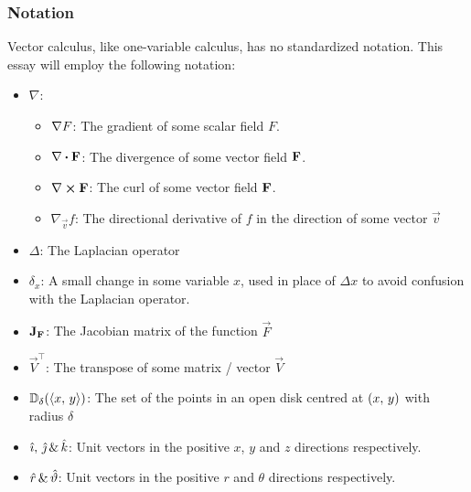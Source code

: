 \subsubsection{Notation}
Vector calculus, like one-variable calculus, has no standardized notation. This essay will employ the following
notation:
\begin{itemize}
	\item $\nabla$:
	\begin{itemize}
		\item $\nabla F$: The gradient of some scalar field $F$.
		\item $\divergence{\fatf}$: The divergence of some vector field $\mathbf{F}$.
		\item $\curl{\fatf}$: The curl of some vector field $\mathbf{F}$.
		\item $\nabla_\vec{v}f$: The directional derivative of $f$ in the direction of some vector $\vec{v}$
	\end{itemize}
	\item $\Delta$: The Laplacian operator
	\item $\delta_x$: A small change in some variable $x$, used in place of $\Delta x$ to avoid confusion with the Laplacian operator.
	\item $\mathbf{J}_{\mathbf{F}}$: The Jacobian matrix of the function $\vec{F}$
	\item $\vec{V}^\top$: The transpose of some matrix / vector $\vec{V}$
	\item $\mathbb{D}_\delta(\langle x,\,y\rangle)$: The set of the points in an open disk centred at $\left(x,\,y\right)$ with radius $\delta$
	\item $\hat{\imath},\,\hat{\jmath}\,\&\,\hat{k}$: Unit vectors in the positive $x$, $y$ and $z$ directions respectively.
	\item $\hat{r}\,\&\,\hat{\vartheta}$: Unit vectors in the positive $r$ and $\theta$ directions respectively.
\end{itemize}


